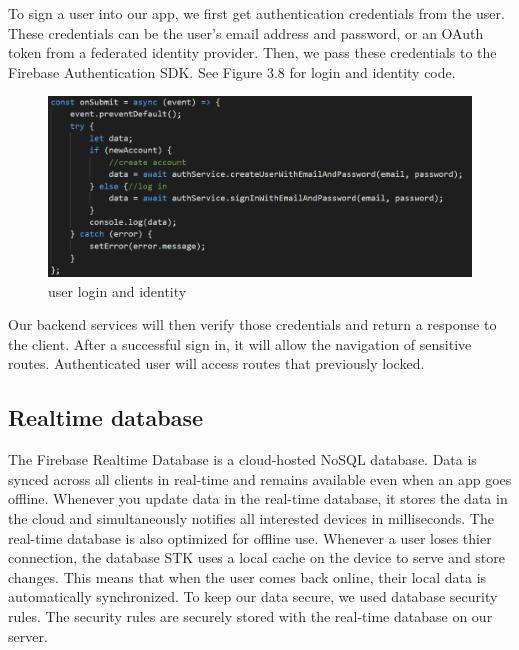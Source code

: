 \vspace{5mm}

To sign a user into our app, we first get authentication credentials from the user. 
These credentials can be the user's email address and password, or an OAuth token from a federated identity provider. Then, we pass these credentials to the Firebase Authentication SDK. See Figure 3.8 for login and identity code.

\begin{figure}[ht]
    \centering
    \includegraphics[scale=0.55]{img/login.PNG}
    \caption{user login and identity}
    \label{fig:my_labe3}
\end{figure}

Our backend services will then verify those credentials and return a response to the client.
After a successful sign in, it will allow the navigation of sensitive routes.
Authenticated user will access routes that previously locked.


\subsection{Realtime database}

The Firebase Realtime Database is a cloud-hosted NoSQL database.
Data is synced across all clients in real-time and remains available even when an app goes offline.
Whenever you update data in the real-time database, it stores the data in the cloud and simultaneously notifies all interested devices in milliseconds. The real-time database is also optimized for offline use.
Whenever a user loses thier connection, the database STK uses a local cache on the device to serve and store changes. This means that when the user comes back online, their local data is automatically synchronized. To keep our data secure, we used database security rules.
The security rules are securely stored with the real-time database on our server.\cite{fbdb}

\vspace{13mm}

